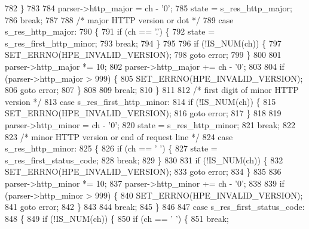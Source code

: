 \begin{DoxyCode}
782         \}
783 
784         parser->http_major = ch - \textcolor{charliteral}{'0'};
785         state = s_res_http_major;
786         \textcolor{keywordflow}{break};
787 
788       \textcolor{comment}{/* major HTTP version or dot */}
789       \textcolor{keywordflow}{case} s_res_http_major:
790       \{
791         \textcolor{keywordflow}{if} (ch == \textcolor{charliteral}{'.'}) \{
792           state = s_res_first_http_minor;
793           \textcolor{keywordflow}{break};
794         \}
795 
796         \textcolor{keywordflow}{if} (!IS_NUM(ch)) \{
797           SET_ERRNO(HPE_INVALID_VERSION);
798           \textcolor{keywordflow}{goto} error;
799         \}
800 
801         parser->http_major *= 10;
802         parser->http_major += ch - \textcolor{charliteral}{'0'};
803 
804         \textcolor{keywordflow}{if} (parser->http_major > 999) \{
805           SET_ERRNO(HPE_INVALID_VERSION);
806           \textcolor{keywordflow}{goto} error;
807         \}
808 
809         \textcolor{keywordflow}{break};
810       \}
811 
812       \textcolor{comment}{/* first digit of minor HTTP version */}
813       \textcolor{keywordflow}{case} s_res_first_http_minor:
814         \textcolor{keywordflow}{if} (!IS_NUM(ch)) \{
815           SET_ERRNO(HPE_INVALID_VERSION);
816           \textcolor{keywordflow}{goto} error;
817         \}
818 
819         parser->http_minor = ch - \textcolor{charliteral}{'0'};
820         state = s_res_http_minor;
821         \textcolor{keywordflow}{break};
822 
823       \textcolor{comment}{/* minor HTTP version or end of request line */}
824       \textcolor{keywordflow}{case} s_res_http_minor:
825       \{
826         \textcolor{keywordflow}{if} (ch == \textcolor{charliteral}{' '}) \{
827           state = s_res_first_status_code;
828           \textcolor{keywordflow}{break};
829         \}
830 
831         \textcolor{keywordflow}{if} (!IS_NUM(ch)) \{
832           SET_ERRNO(HPE_INVALID_VERSION);
833           \textcolor{keywordflow}{goto} error;
834         \}
835 
836         parser->http_minor *= 10;
837         parser->http_minor += ch - \textcolor{charliteral}{'0'};
838 
839         \textcolor{keywordflow}{if} (parser->http_minor > 999) \{
840           SET_ERRNO(HPE_INVALID_VERSION);
841           \textcolor{keywordflow}{goto} error;
842         \}
843 
844         \textcolor{keywordflow}{break};
845       \}
846 
847       \textcolor{keywordflow}{case} s_res_first_status_code:
848       \{
849         \textcolor{keywordflow}{if} (!IS_NUM(ch)) \{
850           \textcolor{keywordflow}{if} (ch == \textcolor{charliteral}{' '}) \{
851             \textcolor{keywordflow}{break};

\end{DoxyCode}
